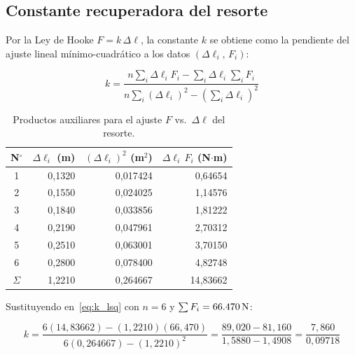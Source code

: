 \subsection{Constante recuperadora del resorte}

Por la Ley de Hooke $F = k\,\Delta\ell$, la constante $k$ se obtiene
como la pendiente del ajuste lineal mínimo-cuadrático a los datos
$(\Delta\ell_i,\,F_i)$:

\begin{equation}
    k = \frac{n\displaystyle\sum_{i}\Delta\ell_i F_i
              - \displaystyle\sum_{i}\Delta\ell_i\displaystyle\sum_{i}F_i}
             {n\displaystyle\sum_{i}(\Delta\ell_i)^2
              - \!\left(\displaystyle\sum_{i}\Delta\ell_i\right)^{\!2}}
    \label{eq:k_lsq}
\end{equation}

\begin{table}[H]
    \centering
    \caption{Productos auxiliares para el ajuste $F$ vs.\ $\Delta\ell$ del resorte.}
    \label{tab:sumas_resorte}
    \begin{tabular}{crrr}
        \toprule
        \textbf{N$^{\circ}$}
            & \textbf{$\Delta\ell_i$ (m)}
            & \textbf{$(\Delta\ell_i)^2$ (m$^2$)}
            & \textbf{$\Delta\ell_i\,F_i$ (N$\cdot$m)} \\
        \midrule
        1 & 0{,}1320 & 0{,}017424 & 0{,}64654 \\
        2 & 0{,}1550 & 0{,}024025 & 1{,}14576 \\
        3 & 0{,}1840 & 0{,}033856 & 1{,}81222 \\
        4 & 0{,}2190 & 0{,}047961 & 2{,}70312 \\
        5 & 0{,}2510 & 0{,}063001 & 3{,}70150 \\
        6 & 0{,}2800 & 0{,}078400 & 4{,}82748 \\
        \midrule
        $\Sigma$ & 1{,}2210 & 0{,}264667 & 14{,}83662 \\
        \bottomrule
    \end{tabular}
\end{table}

Sustituyendo en~\eqref{eq:k_lsq} con $n = 6$ y
$\sum F_i = \qty{66{,}470}{N}$:

\begin{equation*}
    k = \frac{6(14{,}83662) - (1{,}2210)(66{,}470)}
             {6(0{,}264667) - (1{,}2210)^2}
      = \frac{89{,}020 - 81{,}160}
             {1{,}5880 - 1{,}4908}
      = \frac{7{,}860}{0{,}09718}
\end{equation*}

